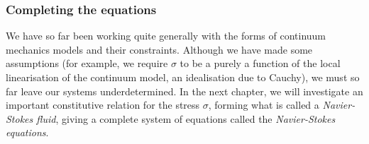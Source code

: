 
\subsubsection{Completing the equations}
We have so far been working quite generally with the forms of continuum mechanics models and their constraints. Although we have made some assumptions
(for example, we require $\sigma$ to be a purely a function of the local linearisation of the continuum model, an idealisation due to Cauchy), we must so far leave
our systems underdetermined.
In the next chapter, we will
investigate an important constitutive relation for the stress $\sigma$, forming what is called a \textit{Navier-Stokes fluid},
giving a complete system of equations called the \textit{Navier-Stokes equations}.
